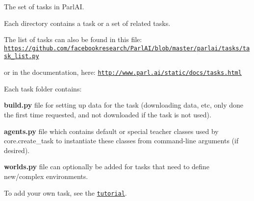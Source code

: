 The set of tasks in Parl\+AI.

Each directory contains a task or a set of related tasks.

The list of tasks can also be found in this file\+: \href{https://github.com/facebookresearch/ParlAI/blob/master/parlai/tasks/task_list.py}{\tt https\+://github.\+com/facebookresearch/\+Parl\+A\+I/blob/master/parlai/tasks/task\+\_\+list.\+py}

or in the documentation, here\+: \href{http://www.parl.ai/static/docs/tasks.html}{\tt http\+://www.\+parl.\+ai/static/docs/tasks.\+html}

Each task folder contains\+:
\begin{DoxyItemize}
\item {\bfseries build.\+py} file for setting up data for the task (downloading data, etc, only done the first time requested, and not downloaded if the task is not used).
\item {\bfseries agents.\+py} file which contains default or special teacher classes used by core.\+create\+\_\+task to instantiate these classes from command-\/line arguments (if desired).
\item {\bfseries worlds.\+py} file can optionally be added for tasks that need to define new/complex environments.
\end{DoxyItemize}

To add your own task, see the \href{http://www.parl.ai/static/docs/tutorial_task.html}{\tt tutorial}. 